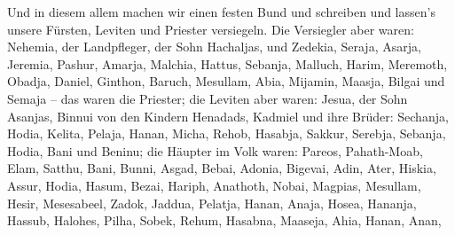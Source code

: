 Und in diesem allem machen wir einen festen Bund und
schreiben und lassen's unsere Fürsten, Leviten und Priester versiegeln.
 Die Versiegler aber waren: Nehemia, der Landpfleger, der
Sohn Hachaljas, und Zedekia,  Seraja, Asarja, Jeremia,
 Pashur, Amarja, Malchia,  Hattus, Sebanja,
Malluch,  Harim, Meremoth, Obadja,  Daniel,
Ginthon, Baruch,  Mesullam, Abia, Mijamin, 
Maasja, Bilgai und Semaja -- das waren die Priester;  die
Leviten aber waren: Jesua, der Sohn Asanjas, Binnui von den Kindern
Henadads, Kadmiel  und ihre Brüder: Sechanja, Hodia,
Kelita, Pelaja, Hanan,  Micha, Rehob, Hasabja,
 Sakkur, Serebja, Sebanja,  Hodia, Bani
und Beninu;  die Häupter im Volk waren: Pareos,
Pahath-Moab, Elam, Satthu, Bani,  Bunni, Asgad, Bebai,
 Adonia, Bigevai, Adin,  Ater, Hiskia,
Assur,  Hodia, Hasum, Bezai,  Hariph,
Anathoth, Nobai,  Magpias, Mesullam, Hesir,
 Mesesabeel, Zadok, Jaddua,  Pelatja,
Hanan, Anaja,  Hosea, Hananja, Hassub, 
Halohes, Pilha, Sobek,  Rehum, Hasabna, Maaseja,
 Ahia, Hanan, Anan,

